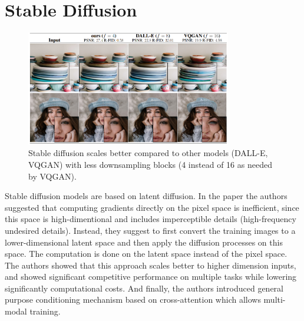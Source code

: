 \section{Stable Diffusion}
\label{sec:stable_diffusion}


\begin{figure}
    \centering
    \includegraphics[width=0.8\textwidth]{images/diffusion_models/stable_diffusion/stable_diffusion.png}
    \caption{Stable diffusion scales better compared to other models \cite{stable_diffusion} (DALL-E, VQGAN) with less downsampling blocks (4 instead of 16 as needed by VQGAN).}
\end{figure}


Stable diffusion models are based on latent diffusion. In the paper \cite{stable_diffusion} the authors suggested that computing gradients directly on the pixel space is inefficient, since this space is high-dimentional and includes imperceptible details (high-frequency undesired details). Instead, they suggest to first convert the training images to a lower-dimensional latent space and then apply the diffusion processes on this space. The computation is done on the latent space instead of the pixel space. The authors showed that this approach scales better to higher dimension inputs, and showed significant competitive performance on multiple tasks while lowering significantly computational costs.  And finally, the authors introduced general purpose conditioning mechanism based on cross-attention which allows multi-modal training.



